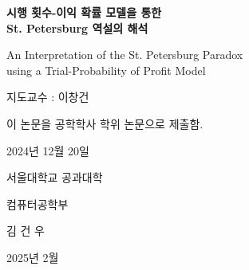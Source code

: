 {\fontsize{24pt}{24pt}\selectfont \textbf{시행 횟수-이익 확률 모델을 통한 \\ St. Petersburg 역설의 해석}}

\vspace{0.5cm}

{\fontsize{18pt}{18pt}\selectfont An Interpretation of the St. Petersburg Paradox \\ using a Trial-Probability of Profit Model}

\vspace{2cm}

{\fontsize{18pt}{18pt}\selectfont 지도교수 : 이창건}

\vspace{2cm}

{\fontsize{20pt}{20pt}\selectfont 이 논문을 공학학사 학위 논문으로 제출함.}

\vspace{2cm}

{\fontsize{18pt}{18pt}\selectfont 2024년 12월 20일}

\vspace{2cm}

{\fontsize{20pt}{20pt}\selectfont 서울대학교 공과대학}

\vspace{0.5cm}

{\fontsize{20pt}{20pt}\selectfont 컴퓨터공학부}

\vspace{0.5cm}

{\fontsize{20pt}{20pt}\selectfont 김 건 우}

\vspace{2cm}

{\fontsize{20pt}{20pt}\selectfont 2025년 2월}